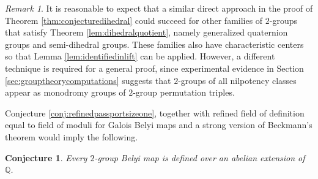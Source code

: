 \documentclass{dcthesis}
\newcommand{\QQ}{\mathbb Q}
\newcommand{\mm}[1]{{\color{blue} \sf MM: [#1]}}
\newcommand{\wt}[1]{\widetilde{#1}}
\DeclareMathOperator{\charpoly}{charpoly}
\DeclareMathOperator{\Tr}{tr}
\numberwithin{equation}{section}
\newtheorem{conj}[equation]{Conjecture}
\theoremstyle{definition}
\theoremstyle{remark}
\newtheorem{remark}[equation]{Remark}
\begin{document}
{{{      %
    \begin{remark}
      \label{rmk:othermaxnilpotency}
      It is reasonable to expect that a similar
      direct approach in the proof of
      Theorem \ref{thm:conjecturedihedral}
      could succeed for other families
      of $2$-groups that satisfy
      Theorem
      \ref{lem:dihedralquotient},
      namely generalized quaternion groups
      and semi-dihedral groups.
      These families also have characteristic
      centers so that
      Lemma
      \ref{lem:identifiedinlift}
      can be applied.
      However,
      a different technique is required for a
      general proof,
      since experimental evidence in
      Section
      \ref{sec:grouptheorycomputations}
      suggests that $2$-groups
      of all nilpotency classes
      appear as monodromy groups
      of $2$-group permutation triples.
    \end{remark}
    Conjecture \ref{conj:refinedpassportsizeone},
    together with refined field of definition
    equal to field of moduli for
    Galois Belyi maps
    and a strong version of
    Beckmann's theorem would imply the following.
    \begin{conj}
      \label{conj:fieldofdefinitionofbelyimap}
      Every $2$-group Belyi map is
      defined over an abelian extension of $\QQ$.

\end{conj}}}}
\end{document}
